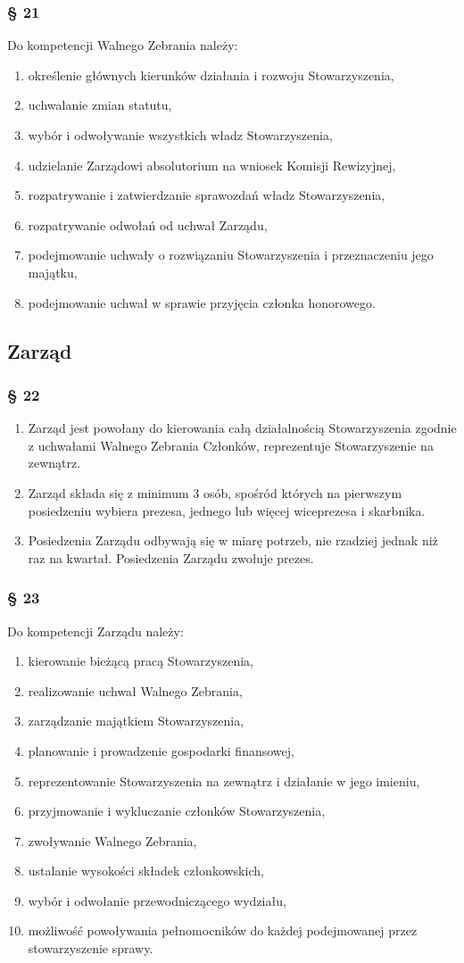\documentclass{article}
\newcommand{\myparagraph}[1]{\subsubsection*{#1}}
\begin{document}
\myparagraph{§ 21}
Do kompetencji Walnego Zebrania należy:
\begin{enumerate}
\item
  określenie głównych kierunków działania i rozwoju Stowarzyszenia,
\item
  uchwalanie zmian statutu,
\item
  wybór i odwoływanie wszystkich władz Stowarzyszenia,
\item
  udzielanie Zarządowi absolutorium na wniosek Komisji Rewizyjnej,
\item
  rozpatrywanie i zatwierdzanie sprawozdań władz Stowarzyszenia,
\item
  rozpatrywanie odwołań od uchwał Zarządu,
\item
  podejmowanie uchwały o rozwiązaniu Stowarzyszenia i przeznaczeniu jego majątku,
\item
  podejmowanie uchwał w sprawie przyjęcia członka honorowego.
\end{enumerate}

\subsection*{Zarząd}
\myparagraph{§ 22}
\begin{enumerate}
\item
  Zarząd jest powołany do kierowania całą działalnością Stowarzyszenia zgodnie z uchwałami Walnego Zebrania Członków, reprezentuje Stowarzyszenie na zewnątrz.
\item
  Zarząd składa się z minimum 3 osób, spośród których na pierwszym posiedzeniu wybiera prezesa, jednego lub więcej wiceprezesa i skarbnika.
\item
  Posiedzenia Zarządu odbywają się w miarę potrzeb, nie rzadziej jednak niż raz na kwartał. Posiedzenia Zarządu zwołuje prezes.
\end{enumerate}

\myparagraph{§ 23}
Do kompetencji Zarządu należy:
\begin{enumerate}
\item
  kierowanie bieżącą pracą Stowarzyszenia,
\item
  realizowanie uchwał Walnego Zebrania,
\item
  zarządzanie majątkiem Stowarzyszenia,
\item
  planowanie i prowadzenie gospodarki finansowej,
\item
  reprezentowanie Stowarzyszenia na zewnątrz i działanie w jego imieniu,
\item
  przyjmowanie i wykluczanie członków Stowarzyszenia,
\item
  zwoływanie Walnego Zebrania,
\item
  ustalanie wysokości składek członkowskich,
\item
  wybór i odwołanie przewodniczącego wydziału,
\item
  możliwość powoływania pełnomocników do każdej podejmowanej przez stowarzyszenie sprawy.
\end{enumerate}
\end{document}
